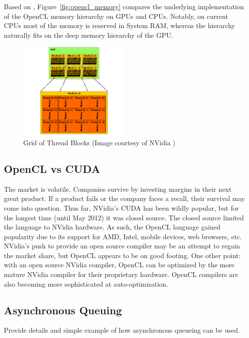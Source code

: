 \documentclass{report}
\begin{document}
Based on \cite{Behr:2009, OpenCL:2009}, Figure~\ref{fig:opencl_memory} compares the underlying implementation of the OpenCL memory hierarchy on GPUs and CPUs. Notably, on current CPUs most of the memory is reserved in System RAM, whereas the hierarchy naturally fits on the deep memory hierarchy of the GPU. 


\begin{figure}
\centering
\includegraphics[width=0.5\textwidth]{gpu_content/nvidia_figures/grid-of-thread-blocks.png}
\caption{Grid of Thread Blocks (Image courtesy of NVidia \cite{CudaGuide2013})} 
\label{fig:grid-of-thread-blocks}
\end{figure}


\subsection{OpenCL vs CUDA}
The market is volatile. Companies survive by investing margins in their next great product. If a product fails or the company faces a recall, their survival may come into question. Thus far, NVidia's CUDA has been wildly popular, but for the longest time (until May 2012) it was closed source. The closed source limited the language to NVidia hardware. As such, the OpenCL language gained popularity due to its support for AMD, Intel, mobile devices, web browsers, etc. NVidia's push to provide an open source compiler may be an attempt to regain the market share, but OpenCL appears to be on good footing. One other point: with an open source NVidia compiler, OpenCL can be optimized by the more mature NVidia compiler for their proprietary hardware. OpenCL compilers are also becoming more sophisticated at auto-optimization. 

\subsection{Asynchronous Queuing} 
Provide details and simple example of how asynchronous queueing can be used. 
\end{document}
